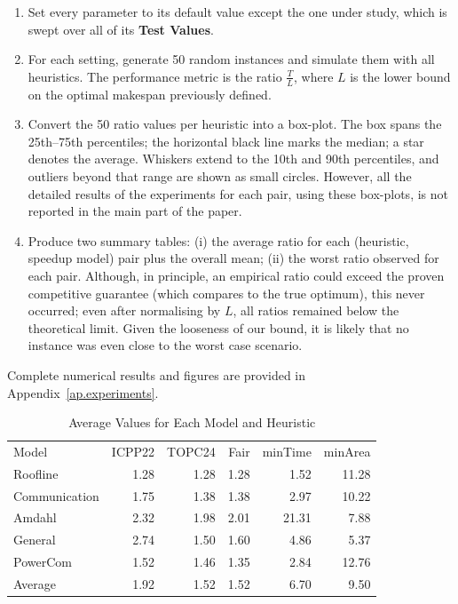 \documentclass{article}
\begin{document}
\begin{enumerate}
    \item Set every parameter to its default value except the one under study,
          which is swept over all of its \textbf{Test Values}.
    \item For each setting, generate 50 random instances and simulate them with
          all heuristics.  
          The performance metric is the ratio \(\tfrac{T}{L}\), where \(L\) is the lower bound on the optimal makespan previously defined.
    \item Convert the 50 ratio values per heuristic into a box-plot.
          The box spans the 25th–75th percentiles; the horizontal black line
          marks the median; a star denotes the average.
          Whiskers extend to the 10th and 90th percentiles, and outliers
          beyond that range are shown as small circles. However, all the detailed results of the experiments for each pair, using these box-plots, is not reported in the main part of the paper.
    \item Produce two summary tables:  
          (i) the average ratio for each (heuristic, speedup model)
          pair plus the overall mean;  
          (ii) the worst ratio observed for each pair.
          Although, in principle, an empirical ratio could exceed the proven
          competitive guarantee (which compares to the true optimum), this
          never occurred; even after normalising by \(L\), all ratios remained
          below the theoretical limit. Given the looseness of our bound, it is likely that no instance was even close to the worst case scenario.
\end{enumerate}

Complete numerical results and figures are provided in
Appendix~\ref{ap.experiments}.

\begin{table}[htbp]
\centering
\caption{Average Values for Each Model and Heuristic}
\label{tab:average_values}
\begin{tabular}{lrrrrr}
\toprule
Model & ICPP22 & TOPC24 & Fair & minTime & minArea \\
Roofline & 1.28 & 1.28 & 1.28 & 1.52 & 11.28 \\
Communication & 1.75 & 1.38 & 1.38 & 2.97 & 10.22 \\
Amdahl & 2.32 & 1.98 & 2.01 & 21.31 & 7.88 \\
General & 2.74 & 1.50 & 1.60 & 4.86 & 5.37 \\
PowerCom & 1.52 & 1.46 & 1.35 & 2.84 & 12.76 \\
\midrule
Average & 1.92 & 1.52 & 1.52 & 6.70 & 9.50 \\
\bottomrule
\end{tabular}
\end{table}
\end{document}
